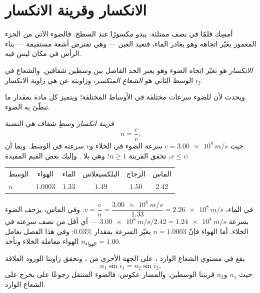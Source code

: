 \section{الانكسار وقرينة الانكسار}

أمسِك قلمًا في  نصف ممتلئة: يبدو مكسورًا عند السطح.
فالضوء الآتي من الجزء المغمور يغيّر اتجاهه وهو يغادر الماء،
فتعيد العين --- وهي تفترض أشعة مستقيمة --- بناء الرأس
في مكان ليس فيه.

\begin{definition}[الانكسار]\label{def:g10:refraction:refraction}
\emph{الانكسار} هو تغيّر اتجاه الضوء
وهو يعبر الحد الفاصل بين وسطين شفافين. والشعاع في
الوسط الثاني هو \emph{الشعاع المنكسر}،
وزاويته عن  هي زاوية الانكسار $i_2$.
\end{definition}

ويحدث  لأن للضوء سرعات مختلفة في الأوساط
المختلفة؛ ويتميز كل مادة بمقدار ما تبطّئ به الضوء.

\begin{definition}\label{def:g10:refraction:index}
\emph{قرينة انكسار} وسطٍ شفاف
هي النسبة
\[
n = \frac{c}{v},
\]
حيث $c = \qty{3.00e8}{m/s}$ سرعة الضوء في الخلاء و$v$ سرعته
في الوسط. وبما أن $v \leq c$، تحقق القرينة $n \geq 1$؛ وهي
بلا . وإليك بعض القيم المفيدة:
\begin{center}
\begin{tabular}{lccccc}
الوسط & الهواء & الماء & البلكسيغلاس & الزجاج & الماس \\
$n$ & $1.0003$ & $1.33$ & $1.49$ & $1.50$ & $2.42$ \\
\end{tabular}
\end{center}
\end{definition}

\begin{example}\label{ex:g10:refraction:speed}
في الماء، $v = \dfrac{c}{n} = \dfrac{\qty{3.00e8}{m/s}}{1.33}
= \qty{2.26e8}{m/s}$. وفي الماس، يزحف الضوء بسرعة
$\qty{3.00e8}{m/s}/2.42 = \qty{1.24e8}{m/s}$ --- أي أقل من نصف سرعته
في الخلاء. أما الهواء فإنّ $n = 1.0003$ يغيّر السرعة بمقدار $0.03\%$: وفي
هذا الفصل نعامل الهواء معاملة الخلاء ونأخذ $n_{\text{الهواء}} = 1.00$.
\end{example}

\begin{theorem}\label{thm:g10:refraction:snell}
يقع  في مستوي الشعاع الوارد ،
على الجهة الأخرى من ، وتحقق زاويتا الورود
 العلاقة
\[
n_1 \sin i_1 = n_2 \sin i_2 ,
\]
حيث $n_1$ و$n_2$ قرينتا  الوسطين. والمسار
عكوس: فالضوء المنتقل رجوعًا على 
يخرج على الشعاع الوارد.
\end{theorem}
\admitted

